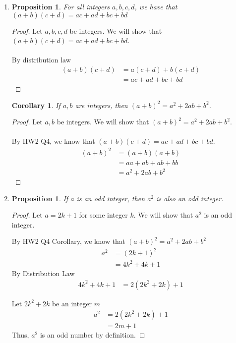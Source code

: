 \documentclass{article}
\newtheorem{prop}[thm]{Proposition}
\newtheorem{cor}[thm]{Corollary}
\begin{document}
\begin{enumerate}
\item 
\begin{prop}
For all integers $a, b, c, d$, we have that $(a + b)(c + d) = ac + ad + bc + bd$
\end{prop}
\begin{proof}
Let $a, b, c ,d$ be integers. We will show that $(a + b)(c + d) = ac + ad + bc + bd$. \\\\
By distribution law 
\begin{align}
(a + b)(c + d) &= a(c + d) + b(c + d) \\ &= ac + ad + bc + bd
\end{align}
\end{proof}

\begin{cor}
If $a, b$ are integers, then $(a + b)^2 = a^2 + 2ab + b^2$.
\end{cor}
\begin{proof}
Let $a, b$ be integers. We will show that $(a + b)^2 = a^2 + 2ab + b^2$. \\\\
By HW2 Q4, we know that $(a + b)(c + d) = ac + ad + bc + bd$.
\begin{align}
(a + b) ^2 &= (a + b)(a + b) \\ &= aa + ab + ab + bb \\ &= a^2 + 2ab + b^2
\end{align}
\end{proof}

\item 
\begin{prop}
If $a$ is an odd integer, then $a^2$ is also an odd integer.
\end{prop}

\begin{proof}
Let $a = 2k +1$ for some integer $k$. We will show that $a^2$ is an odd integer. 

By HW2 Q4 Corollary, we know that $(a + b)^2 = a^2 + 2ab + b^2$
\begin{align}
a^2 &= (2k + 1)^2 \\ &= 4k^2 + 4k + 1
\end{align}
By Distribution Law
\begin{align}
4k^2 + 4k + 1 &= 2(2k^2 + 2k) +1
\end{align}

Let $2k^2 + 2k$ be an integer $m$
\begin{align}
a^2 &= 2(2k^2 + 2k) +1 \\ &= 2m + 1
\end{align}
Thus, $a^2$ is an odd number by definition.
\end{proof}


\end{enumerate}
\end{document}
